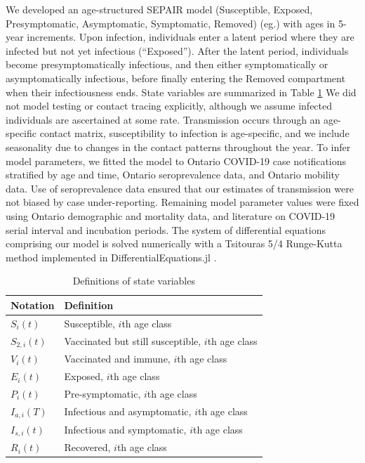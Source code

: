 We developed an age-structured SEPAIR model (Susceptible, Exposed, Presymptomatic, Asymptomatic, Symptomatic, Removed) (eg.\cite{wu2006reducing}) with ages in 5-year increments. Upon infection, individuals enter a latent period where they are infected but not yet infectious (“Exposed”).  After the latent period, individuals become presymptomatically infectious, and then either symptomatically or asymptomatically infectious, before finally entering the Removed compartment when their infectiousness ends. State variables are summarized in Table \ref{state_vars} We did not model testing or contact tracing explicitly, although we assume infected individuals are ascertained at some rate. Transmission occurs through an age-specific contact matrix, susceptibility to infection is age-specific, and we include seasonality due to changes in the contact patterns throughout the year.  To infer model parameters, we fitted the model to Ontario COVID-19 case notifications stratified by age and time, Ontario seroprevalence data, and Ontario mobility data. Use of seroprevalence data ensured that our estimates of transmission were not biased by case under-reporting. Remaining model parameter values were fixed using Ontario demographic and mortality data, and literature on COVID-19 serial interval and incubation periods. The system of differential equations comprising our model is solved numerically with a Tsitouras 5/4 Runge-Kutta method implemented in DifferentialEquations.jl \cite{rackauckas2017differentialequations,bezanson2012julia}.
\begin{table}
  \centering
   \caption{Definitions of state variables}
   \begin{tabular}{l | l}
      Notation & Definition \\
      \hline
      $S_i(t)$ & Susceptible, $i$th age class\\
      $S_{2,i}(t)$ & Vaccinated but still susceptible, $i$th age class\\
      $V_i(t)$ & Vaccinated and immune, $i$th age class\\
      $E_i(t)$ & Exposed, $i$th age class\\
      $P_i(t)$ & Pre-symptomatic, $i$th age class\\
      $I_{a,i}(T)$ & Infectious and asymptomatic, $i$th age class\\
      $I_{s,i}(t)$ & Infectious and symptomatic, $i$th age class\\
      $R_i(t)$ & Recovered, $i$th age class\\
   \end{tabular} 
   \label{state_vars}
\end{table}






